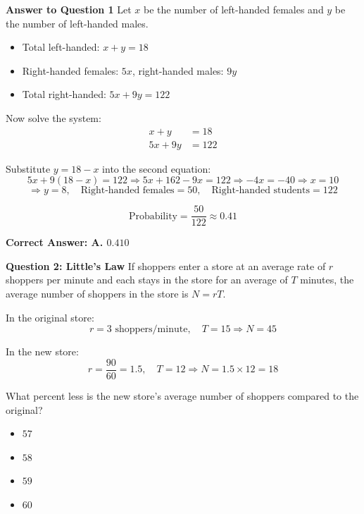 \documentclass{beamer}
\begin{document}
\begin{frame}{\textbf{Answer to Question 1}}
Let \( x \) be the number of left-handed females and \( y \) be the number of left-handed males.

\begin{itemize}
    \item Total left-handed: \( x + y = 18 \)
    \item Right-handed females: \( 5x \), right-handed males: \( 9y \)
    \item Total right-handed: \( 5x + 9y = 122 \)
\end{itemize}

Now solve the system:
\[
\begin{aligned}
x + y &= 18 \\
5x + 9y &= 122
\end{aligned}
\]

Substitute \( y = 18 - x \) into the second equation:
\[
5x + 9(18 - x) = 122 \Rightarrow 5x + 162 - 9x = 122 \Rightarrow -4x = -40 \Rightarrow x = 10
\]
\[
\Rightarrow y = 8, \quad \text{Right-handed females} = 50, \quad \text{Right-handed students} = 122
\]

\[
\text{Probability} = \frac{50}{122} \approx 0.41
\]

\textbf{Correct Answer: A. \( 0.410 \)}
\end{frame}



\begin{frame}{\textbf{Question 2: Little's Law}}
If shoppers enter a store at an average rate of \( r \) shoppers per minute and each stays in the store for an average of \( T \) minutes, the average number of shoppers in the store is \( N = rT \).

In the original store:
\[
r = 3 \text{ shoppers/minute}, \quad T = 15 \Rightarrow N = 45
\]

In the new store:
\[
r = \frac{90}{60} = 1.5, \quad T = 12 \Rightarrow N = 1.5 \times 12 = 18
\]

What percent less is the new store’s average number of shoppers compared to the original?

\begin{itemize}
    \item[A.] \( 57 \)
    \item[B.] \( 58 \)
    \item[C.] \( 59 \)
    \item[D.] \( 60 \)
\end{itemize}
\end{frame}
\end{document}
